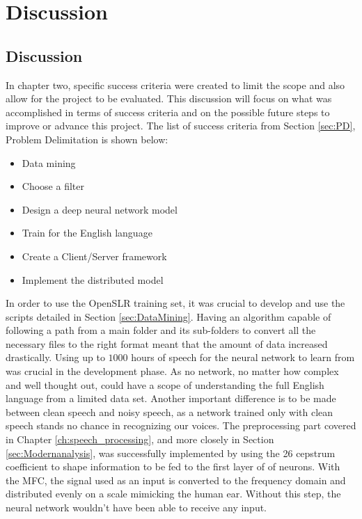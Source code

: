 \chapter{Discussion}\label{ch:discussion}

\section{Discussion}
In chapter two, specific success criteria were created to limit the scope and also allow for the project to be evaluated. This discussion will focus on what was accomplished in terms of success criteria and on the possible future steps to improve or advance this project. The list of success criteria from Section \ref{sec:PD}, Problem Delimitation is shown below:

\begin{itemize}
	\item Data mining
	\item Choose a filter
	\item Design a deep neural network model
	\item Train for the English language
	\item Create a Client/Server framework
	\item Implement the distributed model
\end{itemize} 

In order to use the OpenSLR training set, it was crucial to develop and use the 
scripts detailed in Section \ref{sec:DataMining}.
 Having an algorithm capable of following a path from a main folder and its sub-folders to convert all the necessary files to the right format meant that the 
 amount of data increased drastically.
  Using up to $1000$ hours of speech for the neural network to learn from was 
  crucial in the development phase. 
  As no network, no matter how complex and well thought out, could have a scope of 
  understanding the full English language from a limited data set. 
  Another important difference is to be made between clean speech and noisy speech, 
  as a network trained only with clean speech stands no chance in recognizing our 
  voices. 
  The preprocessing part covered in Chapter \ref{ch:speech_processing}, and more
   closely in Section \ref{sec:Modernanalysis}, was  successfully implemented by 
   using the 26 cepstrum coefficient to shape information to be fed to the first 
   layer of of neurons. With the MFC, the signal used as an input is converted to the frequency
   domain and distributed evenly on a scale mimicking the human ear. Without this step, the neural
   network wouldn't have been able to receive any input.\\
   
